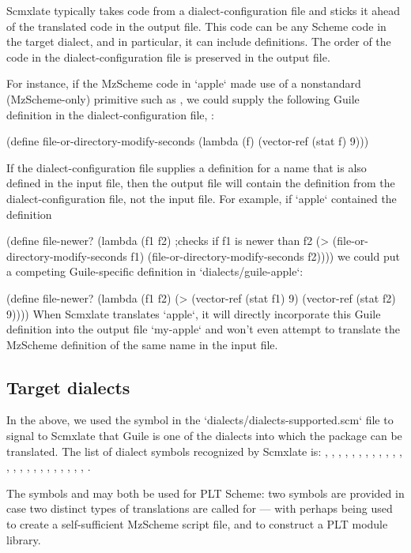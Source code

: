 Scmxlate typically takes code from a
dialect-configuration file and sticks it  ahead of the
translated code in the output file.  This code can be
any Scheme code in the target dialect, and in
particular, it can include definitions.  The order of
the code in the dialect-configuration file is preserved
in the output file.

For instance, if the MzScheme code in `apple` made
use of a nonstandard (MzScheme-only) primitive such as
, we could supply
the following Guile definition in the
dialect-configuration file,
:

\begintts
(define file-or-directory-modify-seconds
  (lambda (f) (vector-ref (stat f) 9)))
\endtt

If the dialect-configuration file supplies a definition for
a name that is also defined in the input file,
then the output file will contain the definition from
the dialect-configuration file, not the input file.
For example, if `apple` contained
the definition

\begintts
(define file-newer?
  (lambda (f1 f2)
    ;checks if f1 is newer than f2
    (> (file-or-directory-modify-seconds f1)
       (file-or-directory-modify-seconds f2))))
\endtt
we could put a competing Guile-specific definition
in `dialects/guile-apple`:

\begintts
(define file-newer?
  (lambda (f1 f2)
    (> (vector-ref (stat f1) 9)
       (vector-ref (stat f2) 9))))
\endtt
When Scmxlate translates `apple`, it will directly
incorporate this Guile definition into the output file
`my-apple` and won’t even attempt to translate
the MzScheme definition of the same name in the
input file.

\subsection{Target dialects}

In the above, we used the symbol  in the
`dialects/dialects-supported.scm` file to signal to
Scmxlate that Guile is one of the dialects into which
the package can be translated.  The list of dialect symbols
recognized by Scmxlate is: , ,
, , ,
, , , , , ,
, , , , ,
, ,
, , , , ,
, .

The symbols  and 
may both be used for PLT Scheme: two symbols are
provided in case two distinct types of translations are
called for --- with  perhaps being used to create a
self-sufficient MzScheme script file, and  to construct a
PLT module library.

